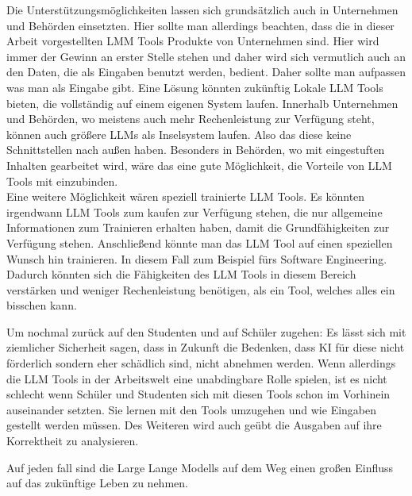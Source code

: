 Die Unterstützungsmöglichkeiten lassen sich grundsätzlich auch in Unternehmen und Behörden einsetzten. Hier sollte man 
allerdings beachten, dass die in dieser Arbeit vorgestellten LMM Tools Produkte von Unternehmen sind. Hier wird immer 
der Gewinn an erster Stelle stehen und daher wird sich vermutlich auch an den Daten, die als Eingaben benutzt werden, 
bedient. Daher sollte man aufpassen was man als Eingabe gibt. Eine Lösung könnten zukünftig Lokale LLM Tools bieten,
die vollständig auf einem eigenen System laufen. Innerhalb Unternehmen und Behörden, wo meistens auch mehr Rechenleistung 
zur Verfügung steht, können auch größere LLMs als Inselsystem laufen. Also das diese keine Schnittstellen nach außen 
haben. Besonders in Behörden, wo mit eingestuften Inhalten gearbeitet wird, wäre das eine gute Möglichkeit, die Vorteile 
von LLM Tools mit einzubinden.\\
Eine weitere Möglichkeit wären speziell trainierte LLM Tools. Es könnten irgendwann LLM Tools zum kaufen zur 
Verfügung stehen, die nur allgemeine Informationen zum Trainieren erhalten haben, damit die Grundfähigkeiten zur 
Verfügung stehen. Anschließend könnte man das LLM Tool auf einen speziellen Wunsch hin trainieren. In diesem 
Fall zum Beispiel fürs Software Engineering. Dadurch könnten sich die Fähigkeiten des LLM Tools in diesem Bereich 
verstärken und weniger Rechenleistung benötigen, als ein Tool, welches alles ein bisschen kann.

Um nochmal zurück auf den Studenten und auf Schüler zugehen: Es lässt sich mit ziemlicher Sicherheit sagen, 
dass in Zukunft die Bedenken, dass KI für diese nicht förderlich sondern eher schädlich sind, nicht abnehmen 
werden. Wenn allerdings die LLM Tools in der Arbeitswelt eine unabdingbare Rolle spielen, ist es nicht schlecht 
wenn Schüler und Studenten sich mit diesen Tools schon im Vorhinein auseinander setzten. Sie lernen mit den Tools 
umzugehen und wie Eingaben gestellt werden müssen. Des Weiteren wird auch geübt die Ausgaben auf ihre Korrektheit 
zu analysieren.

Auf jeden fall sind die Large Lange Modells auf dem Weg einen großen Einfluss auf das zukünftige Leben zu nehmen.